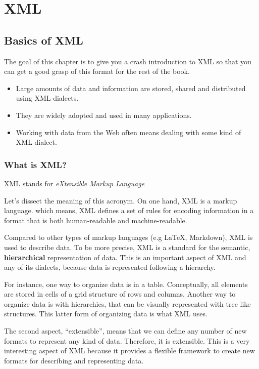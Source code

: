 \documentclass[
]{book}
\begin{document}
\hypertarget{part-xml}{%
\part{XML}\label{part-xml}}

\hypertarget{xml}{%
\chapter{Basics of XML}\label{xml}}

The goal of this chapter is to give you a crash introduction to XML so that
you can get a good grasp of this format for the rest of the book.

\begin{itemize}
\item
  Large amounts of data and information are stored, shared and distributed
  using XML-dialects.
\item
  They are widely adopted and used in many applications.
\item
  Working with data from the Web often means dealing with some kind of XML
  dialect.
\end{itemize}

\hypertarget{what-is-xml}{%
\section{What is XML?}\label{what-is-xml}}

XML stands for \emph{eXtensible Markup Language}

Let's dissect the meaning of this acronym. On one hand, XML is a markup language.
which means, XML defines a set of rules for encoding information in a format
that is both human-readable and machine-readable.

Compared to other types of markup languages (e.g LaTeX, Markdown), XML is used
to describe data. To be more precise, XML is a standard for the semantic,
\textbf{hierarchical} representation of data. This is an important aspect of XML
and any of its dialects, because data is represented following a hierarchy.

For instance, one way to organize data is in a table. Conceptually, all elements
are stored in cells of a grid structure of rows and columns. Another way to
organize data is with hierarchies, that can be visually represented with tree
like structures. This latter form of organizing data is what XML uses.

The second aspect, ``extensible'', means that we can define any number of new
formats to represent any kind of data. Therefore, it is extensible.
This is a very interesting aspect of XML because it provides a flexible
framework to create new formats for describing and representing data.
\end{document}
